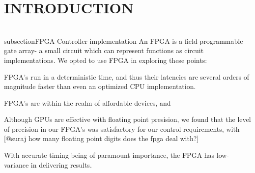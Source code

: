 \section{INTRODUCTION}

\\subsection{FPGA Controller implementation} %
\label{sub:fpga_controller_implementation}
An FPGA is a field-programmable gate array- a small circuit which can represent functions as circuit implementations.
We opted to use FPGA in exploring these points:
\item FPGA's run in a deterministic time, and thus their latencies are several orders of magnitude faster than even an optimized CPU implementation.
\item FPGA's are within the realm of affordable devices, and 
\item Although GPUs are effective with floating point presision, we found that the level of precision in our FPGA's was satisfactory for our control requirements, with [@suraj how many floating point digits does the fpga deal with?]
\item With accurate timing being of paramount importance, the FPGA has low-variance in delivering results.


